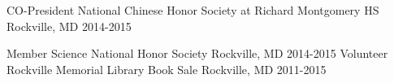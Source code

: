 

\begin{cvhonors}

  \cvhonor
    {CO-President}
    {National Chinese Honor Society at Richard Montgomery HS}
    {Rockville, MD}
    {2014-2015}

  \cvhonor
    {Member}
    {Science National Honor Society}
    {Rockville, MD}
    {2014-2015}
  \cvhonor
    {Volunteer}
    {Rockville Memorial Library Book Sale}
    {Rockville, MD}
    {2011-2015}


\end{cvhonors}
